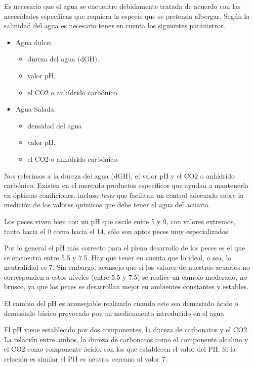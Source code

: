 Es necesario que el agua se encuentre debidamente tratada de acuerdo con las necesidades específicas que requiera la especie que se pretenda albergar. Según la salinidad del agua es necesario tener en cuenta los siguientes parámetros.

\begin{itemize}
\item Agua dulce:
	\begin{itemize}
		\item dureza del agua (dGH).
		\item valor pH.
		\item el CO2  o anhídrido carbónico.
	\end{itemize}
	\vspace{5px}
	\item Agua Salada:
	\begin{itemize}
		\item densidad del agua
		\item valor pH.
		\item el CO2  o anhídrido carbónico.
	\end{itemize}
	
\end{itemize}


Nos referimos a la dureza del agua (dGH), el valor pH y el CO2  o anhídrido carbónico. Existen en el mercado productos específicos que ayudan a mantenerla en óptimas condiciones, incluso \textit{tests} que facilitan un control adecuado sobre la medición de los valores químicos que debe tener el agua del acuario.

Los peces viven bien con un pH que oscile entre 5 y 9, con valores extremos, tanto hacia el 0 como hacia el 14, sólo son aptos peces muy especializados.

Por lo general el pH más correcto para el pleno desarrollo de los peces es el que se encuentra entre 5.5 y 7.5. Hay que tener en cuenta que lo ideal, o sea, la neutralidad es 7. Sin embargo, aconsejo que si los valores de nuestros acuarios no corresponden a estos niveles (entre 5.5 y 7.5) se realice un cambio moderado, no brusco, ya que los peces se desarrollan mejor en ambientes constantes y estables.

El cambio del pH es aconsejable realizarlo cuando este sea demasiado ácido o demasiado básico provocado por un medicamento introducido en el agua

El pH viene establecido por dos componentes, la dureza de carbonatos y el CO2. La relación entre ambos, la dureza de carbonatos como el componente alcalino y el CO2 como componente ácido, son los que establecen el valor del PH. Si la relación es similar el PH es neutro, cercano al valor 7. 

